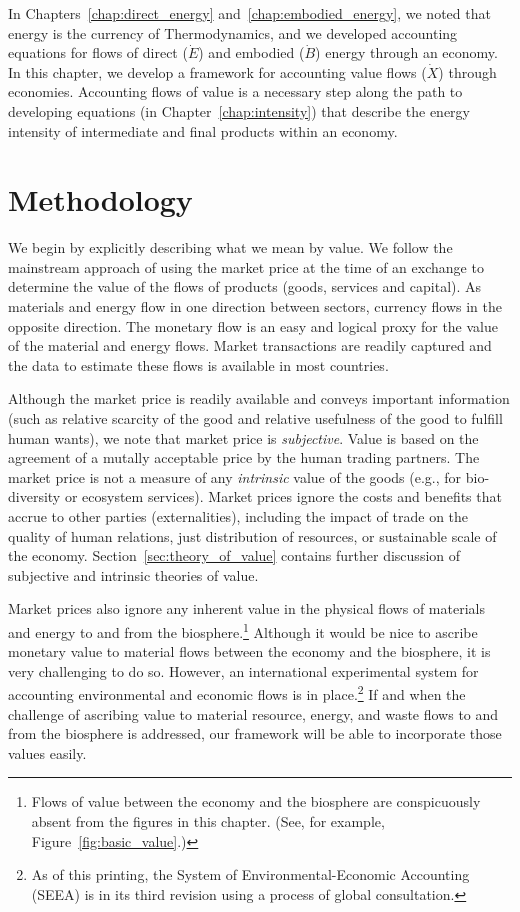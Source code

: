 In Chapters~\ref{chap:direct_energy} and~\ref{chap:embodied_energy}, 
we noted that energy is the currency of Thermodynamics,
and we developed accounting equations for flows of 
direct ($\dot{E}$) and embodied ($\dot{B}$) energy through an economy.
In this chapter, we develop a framework for accounting
value flows ($\dot{X}$) through economies.
Accounting flows of value is a necessary step along
the path to developing equations (in Chapter~\ref{chap:intensity}) 
that describe the energy intensity of intermediate
and final products within an economy.


\section{Methodology}
\label{sec:Value_Methodology}


We begin by explicitly describing what we mean by value. 
We follow the mainstream approach 
of using the market price at the time of an exchange
to determine the value of the flows of products (goods, services and capital). 
As materials and energy flow in one direction between sectors, 
currency flows in the opposite direction. 
The monetary flow is an easy and logical
proxy for the value of the material and energy flows. 
Market transactions are readily captured and the data 
to estimate these flows is available in most countries.\cite{IIOA-Data}

Although the market price is readily available and conveys important information (such as
relative scarcity of the good and relative usefulness of the good to fulfill human wants), we note that market
price is \emph{subjective}.  
Value is based on the agreement of a mutally acceptable price 
by the human trading partners. 
The market price
is not a measure of any \emph{intrinsic}
value of the goods (e.g., for bio-diversity or ecosystem services). 
Market prices ignore the costs and benefits that accrue 
to other parties (externalities), 
including the impact of trade on the quality of human relations, 
just distribution of resources, 
or sustainable scale of the economy.\cite[p.~55]{Daly1997} 
Section~\ref{sec:theory_of_value} 
contains further discussion of subjective and intrinsic theories of value. 

Market prices also ignore any inherent value 
in the physical flows
of materials and energy to and from the biosphere.\footnote{Flows 
	of value between the economy and the biosphere
	are conspicuously absent 
	from the figures in this chapter. 
	(See, for example, Figure~\ref{fig:basic_value}.)}
Although it would be nice to ascribe monetary value to material flows between
the economy and the biosphere, it is very challenging to do so.\cite{Nordhaus:1999aa,SEEA2012}
However, an international experimental system 
for accounting environmental and economic flows is in place.\footnote{As of this printing, 
the System of Environmental-Economic Accounting (SEEA) is in its third revision 
using a process of global consultation.}\cite{UNSEEA:aa}
If and when the challenge of ascribing value
to material resource, energy, and waste flows 
to and from the biosphere is addressed, 
our framework will be able to incorporate those values easily.  

